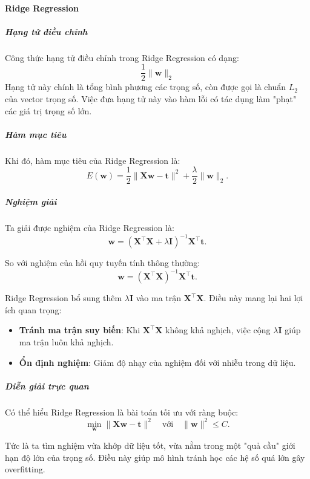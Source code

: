 \paragraph{Ridge Regression}

\subparagraph{Hạng tử điều chỉnh}
Công thức hạng tử điều chỉnh trong Ridge Regression có dạng:
\begin{equation}
  \frac{1}{2}\|\boldsymbol{w}\|_2
\end{equation}
Hạng tử này chính là tổng bình phương các trọng số, còn được gọi là chuẩn
$L_2$ của vector trọng số.
Việc đưa hạng tử này vào hàm lỗi có tác dụng làm "phạt" các giá trị trọng số
lớn.

\subparagraph{Hàm mục tiêu}
Khi đó, hàm mục tiêu của Ridge Regression là:
\begin{equation}
  E(\boldsymbol{w}) = \frac{1}{2} \|\boldsymbol{X}\boldsymbol{w} -
  \boldsymbol{t}\|^2 + \frac{\lambda}{2}\|\boldsymbol{w}\|_2.
\end{equation}

\subparagraph{Nghiệm giải}
Ta giải được nghiệm của Ridge Regression là:
\begin{equation}
  \boldsymbol{w} = (\boldsymbol{X}^{\intercal}\boldsymbol{X} + \lambda
  \boldsymbol{I})^{-1}\boldsymbol{X}^{\intercal}\boldsymbol{t}.
\end{equation}

So với nghiệm của hồi quy tuyến tính thông thường:
\begin{equation}
  \boldsymbol{w} = (\boldsymbol{X}^{\intercal}\boldsymbol{X})^{-1}
  \boldsymbol{X}^{\intercal}\boldsymbol{t}.
\end{equation}

Ridge Regression bổ sung thêm $\lambda \boldsymbol{I}$ vào ma trận
$\boldsymbol{X}^{\intercal}\boldsymbol{X}$. Điều này mang lại hai lợi ích quan
trọng:
\begin{itemize}
  \item \textbf{Tránh ma trận suy biến}: Khi $\boldsymbol{X}^{\intercal}
  \boldsymbol{X}$ không khả nghịch, việc cộng $\lambda \boldsymbol{I}$ giúp ma
  trận luôn khả nghịch.
  \item \textbf{Ổn định nghiệm}: Giảm độ nhạy của nghiệm đối với nhiễu trong
  dữ liệu.
\end{itemize}

\subparagraph{Diễn giải trực quan}
Có thể hiểu Ridge Regression là bài toán tối ưu với ràng buộc:
\begin{equation}
  \min_{\boldsymbol{w}} \|\boldsymbol{X}\boldsymbol{w} - \boldsymbol{t}\|^2
  \quad \text{với} \quad\|\boldsymbol{w}\|^2 \leq C.
\end{equation}

Tức là ta tìm nghiệm vừa khớp dữ liệu tốt, vừa nằm trong một "quả cầu" giới
hạn độ lớn của trọng số. Điều này giúp mô hình tránh học các hệ số quá lớn gây
overfitting.
